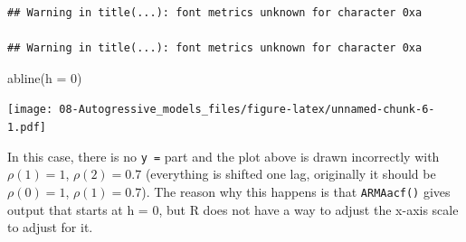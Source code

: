 \documentclass[
]{book}
\newenvironment{Shaded}{\begin{snugshade}}{\end{snugshade}}
\newcommand{\AttributeTok}[1]{\textcolor[rgb]{0.77,0.63,0.00}{#1}}
\newcommand{\DecValTok}[1]{\textcolor[rgb]{0.00,0.00,0.81}{#1}}
\newcommand{\FunctionTok}[1]{\textcolor[rgb]{0.00,0.00,0.00}{#1}}
\newcommand{\NormalTok}[1]{#1}
\theoremstyle{definition}
\theoremstyle{definition}
\theoremstyle{definition}
\theoremstyle{definition}
\theoremstyle{remark}
\begin{document}
\begin{verbatim}
## Warning in title(...): font metrics unknown for character 0xa

## Warning in title(...): font metrics unknown for character 0xa
\end{verbatim}

\begin{Shaded}
\begin{Highlighting}[]
\FunctionTok{abline}\NormalTok{(}\AttributeTok{h =} \DecValTok{0}\NormalTok{)}
\end{Highlighting}
\end{Shaded}

\texttt{[image: 08-Autogressive\_models\_files/figure-latex/unnamed-chunk-6-1.pdf]}

In this case, there is no \texttt{y\ =} part and the plot above is drawn incorrectly with \(\rho(1) = 1\), \(\rho(2) = 0.7\) (everything is shifted one lag, originally it should be \(\rho(0) = 1\), \(\rho(1) = 0.7\)). The reason why this happens is that \texttt{ARMAacf()} gives output that starts at h = 0, but R does not have a way to adjust the x-axis scale to adjust for it.
\end{document}
